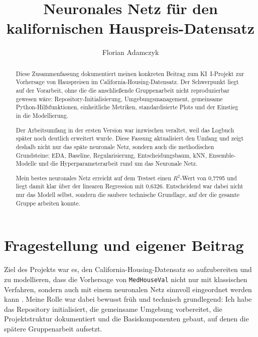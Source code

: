 \documentclass[9pt,a4paper,twocolumn,twoside]{tau-class/tau}
\begin{document}
\clearpage
\hypersetup{pageanchor=true}
\setcounter{page}{1}

\title{Neuronales Netz f\"ur den kalifornischen Hauspreis-Datensatz}
\author[a]{Florian Adamczyk}
\theday{\today}

\begin{abstract}
Diese Zusammenfassung dokumentiert meinen konkreten Beitrag zum KI~I-Projekt zur Vorhersage von Hauspreisen im California-Housing-Datensatz. Der Schwerpunkt liegt auf der Vorarbeit, ohne die die anschlie\ss{}ende Gruppenarbeit nicht reproduzierbar gewesen w\"are: Repository-Initialisierung, Umgebungsmanagement, gemeinsame Python-Hilfsfunktionen, einheitliche Metriken, standardisierte Plots und der Einstieg in die Modellierung.

Der Arbeitsumfang in der ersten Version war inzwischen veraltet, weil das Logbuch sp\"ater noch deutlich erweitert wurde. Diese Fassung aktualisiert den Umfang und zeigt deshalb nicht nur das sp\"ate neuronale Netz, sondern auch die methodischen Grundsteine: EDA, Baseline, Regularisierung, Entscheidungsbaum, kNN, Ensemble-Modelle und die Hyperparameterarbeit rund um das Neuronale Netz.

Mein bestes neuronales Netz erreicht auf dem Testset einen $R^2$-Wert von 0{,}7795 und liegt damit klar \"uber der linearen Regression mit 0{,}6326. Entscheidend war dabei nicht nur das Modell selbst, sondern die saubere technische Grundlage, auf der die gesamte Gruppe arbeiten konnte.
\end{abstract}


\maketitle
\thispagestyle{firststyle}

\section{Fragestellung und eigener Beitrag}
Ziel des Projekts war es, den California-Housing-Datensatz so aufzubereiten und zu modellieren, dass die Vorhersage von \texttt{MedHouseVal} nicht nur mit klassischen Verfahren, sondern auch mit einem neuronalen Netz sinnvoll eingeordnet werden kann \cite{aufgabe,sklearnHousing}. Meine Rolle war dabei bewusst fr\"uh und technisch grundlegend: Ich habe das Repository initialisiert, die gemeinsame Umgebung vorbereitet, die Projektstruktur dokumentiert und die Basiskomponenten gebaut, auf denen die sp\"atere Gruppenarbeit aufsetzt.
\end{document}
